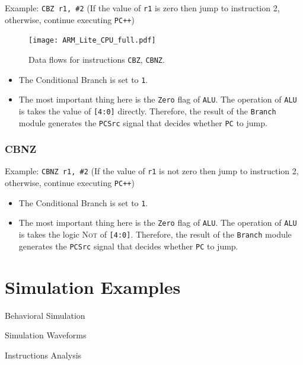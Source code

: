 \documentclass[11pt,fancy,bibstyle=ieee]{elegantbook}
\begin{document}
      Example: \texttt{CBZ r1, \#2} (If the value of \texttt{r1} is zero then jump to instruction 2, otherwise, continue executing \texttt{PC++})

      \begin{figure}[htbp]
        \centering
        \texttt{[image: ARM\_Lite\_CPU\_full.pdf]}
        \caption{Data flows for instructions \texttt{CBZ}, \texttt{CBNZ}.}
        \label{fig:CPU_p7}
      \end{figure}

      \begin{itemize}
        \item The Conditional Branch is set to \texttt{1}.
        \item The most important thing here is the \texttt{Zero} flag of \texttt{ALU}. The operation of \texttt{ALU} is takes the value of \texttt{[4:0]} directly. Therefore, the result of the \texttt{Branch} module generates the \texttt{PCSrc} signal that decides whether \texttt{PC} to jump.
      \end{itemize}

    \subsection{CBNZ}

      Example: \texttt{CBNZ r1, \#2} (If the value of \texttt{r1} is not zero then jump to instruction 2, otherwise, continue executing \texttt{PC++})

      \begin{itemize}
        \item The Conditional Branch is set to \texttt{1}.
        \item The most important thing here is the \texttt{Zero} flag of \texttt{ALU}. The operation of \texttt{ALU} is takes the logic \textsc{Not} of \texttt{[4:0]}. Therefore, the result of the \texttt{Branch} module generates the \texttt{PCSrc} signal that decides whether \texttt{PC} to jump.
      \end{itemize}

\chapter{Simulation Examples}

  \begin{introduction}
    \item Behavioral Simulation
    \item Simulation Waveforms
    \item Instructions Analysis
  \end{introduction}
\end{document}
